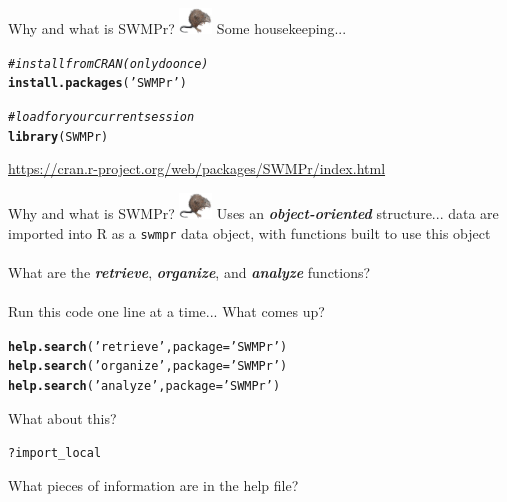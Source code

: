 \documentclass[xcolor=dvipsnames,serif]{beamer}\usepackage[]{graphicx}\usepackage[]{color}
\makeatletter
\newcommand{\hlstr}[1]{\textcolor[rgb]{0.192,0.494,0.8}{#1}}%
\newcommand{\hlcom}[1]{\textcolor[rgb]{0.678,0.584,0.686}{\textit{#1}}}%
\newcommand{\hlopt}[1]{\textcolor[rgb]{0,0,0}{#1}}%
\newcommand{\hlstd}[1]{\textcolor[rgb]{0.345,0.345,0.345}{#1}}%
\newcommand{\hlkwc}[1]{\textcolor[rgb]{0.333,0.667,0.333}{#1}}%
\newcommand{\hlkwd}[1]{\textcolor[rgb]{0.737,0.353,0.396}{\textbf{#1}}}%
\newenvironment{kframe}{%
 \def\at@end@of@kframe{}%
 \ifinner\ifhmode%
  \def\at@end@of@kframe{\end{minipage}}%
  \begin{minipage}{\columnwidth}%
 \fi\fi%
 \def\FrameCommand##1{\hskip\@totalleftmargin \hskip-\fboxsep
 \colorbox{shadecolor}{##1}\hskip-\fboxsep
     \hskip-\linewidth \hskip-\@totalleftmargin \hskip\columnwidth}%
 \MakeFramed {\advance\hsize-\width
   \@totalleftmargin\z@ \linewidth\hsize
   \@setminipage}}%
 {\par\unskip\endMakeFramed%
 \at@end@of@kframe}
\newenvironment{knitrout}{}{} %
\newcommand{\Bigtxt}[1]{\textbf{\textit{#1}}}
\makeatother
\begin{document}
\begin{frame}[fragile]{Why and what is SWMPr? \includegraphics[width = 0.065\textwidth]{imgs/swmprat.png}}
Some housekeeping...
\begin{knitrout}\scriptsize
{}\color{fgcolor}\begin{kframe}
\begin{alltt}
\hlcom{# install from CRAN (only do once)}
\hlkwd{install.packages}\hlstd{(}\hlstr{'SWMPr'}\hlstd{)}

\hlcom{# load for your current session}
\hlkwd{library}\hlstd{(SWMPr)}
\end{alltt}
\end{kframe}
\end{knitrout}
\url{https://cran.r-project.org/web/packages/SWMPr/index.html}
\end{frame}

\begin{frame}[fragile]{Why and what is SWMPr? \includegraphics[width = 0.065\textwidth]{imgs/swmprat.png}}
\onslide<+->
Uses an \Bigtxt{object-oriented} structure... data are imported into R as a \texttt{swmpr} data object, with functions built to use this object\\~\\
What are the \Bigtxt{retrieve}, \Bigtxt{organize}, and \Bigtxt{analyze} functions? \\~\\
Run this code one line at a time... What comes up?
\begin{knitrout}\scriptsize
{}\color{fgcolor}\begin{kframe}
\begin{alltt}
\hlkwd{help.search}\hlstd{(}\hlstr{'retrieve'}\hlstd{,} \hlkwc{package} \hlstd{=} \hlstr{'SWMPr'}\hlstd{)}
\hlkwd{help.search}\hlstd{(}\hlstr{'organize'}\hlstd{,} \hlkwc{package} \hlstd{=} \hlstr{'SWMPr'}\hlstd{)}
\hlkwd{help.search}\hlstd{(}\hlstr{'analyze'}\hlstd{,} \hlkwc{package} \hlstd{=} \hlstr{'SWMPr'}\hlstd{)}
\end{alltt}
\end{kframe}
\end{knitrout}
\onslide<+->
What about this?
\begin{knitrout}\scriptsize
{}\color{fgcolor}\begin{kframe}
\begin{alltt}
\hlopt{?}\hlstd{import_local}
\end{alltt}
\end{kframe}
\end{knitrout}
What pieces of information are in the help file?
\end{frame}
\end{document}
